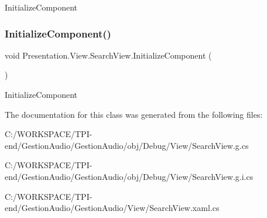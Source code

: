 Initialize\+Component 

\mbox{\label{class_presentation_1_1_view_1_1_search_view_ac553fc7552d2de3e43a6b574d7176220}} 
\subsubsection{\texorpdfstring{Initialize\+Component()}{InitializeComponent()}\hspace{0.1cm}{\footnotesize\ttfamily [4/4]}}
{\footnotesize\ttfamily void Presentation.\+View.\+Search\+View.\+Initialize\+Component (\begin{DoxyParamCaption}{ }\end{DoxyParamCaption})}



Initialize\+Component 



The documentation for this class was generated from the following files\+:\begin{DoxyCompactItemize}
\item 
C\+:/\+W\+O\+R\+K\+S\+P\+A\+C\+E/\+T\+P\+I-\/end/\+Gestion\+Audio/\+Gestion\+Audio/obj/\+Debug/\+View/Search\+View.\+g.\+cs\item 
C\+:/\+W\+O\+R\+K\+S\+P\+A\+C\+E/\+T\+P\+I-\/end/\+Gestion\+Audio/\+Gestion\+Audio/obj/\+Debug/\+View/Search\+View.\+g.\+i.\+cs\item 
C\+:/\+W\+O\+R\+K\+S\+P\+A\+C\+E/\+T\+P\+I-\/end/\+Gestion\+Audio/\+Gestion\+Audio/\+View/Search\+View.\+xaml.\+cs\end{DoxyCompactItemize}
